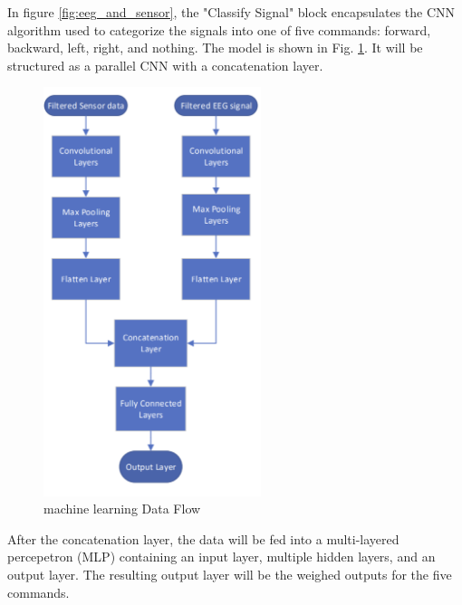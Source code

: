 \documentclass[conference]{IEEEtran}
\begin{document}
        In figure \ref{fig:eeg_and_sensor}, the "Classify Signal" block encapsulates the CNN algorithm used to categorize the signals into one of five commands: forward, backward, left, right, and nothing. The model is shown in Fig. \ref{fig:ml-flow}. It will be structured as a parallel CNN with a concatenation layer. 

         \begin{figure}[htbp]
            \centering
            \includegraphics[height=4.7in, keepaspectratio]{figs/D/ml-flow.png}
            \caption{machine learning Data Flow}
            \label{fig:ml-flow}
        \end{figure}

        After the concatenation layer, the data will be fed into a multi-layered percepetron (MLP) containing an input layer, multiple hidden layers, and an output layer. The resulting output layer will be the weighed outputs for the five commands. 
\end{document}
